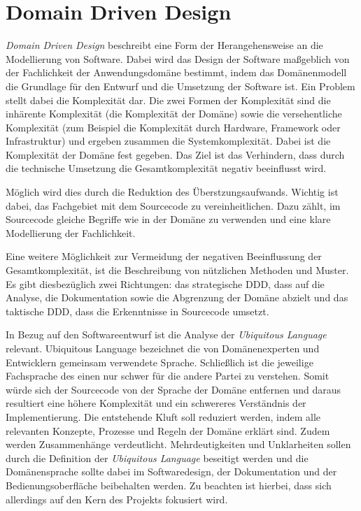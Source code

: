 \chapter{Domain Driven Design}
\textit{Domain Driven Design} beschreibt eine Form der Herangehensweise an die Modellierung von Software.
Dabei wird das Design der Software maßgeblich von der Fachlichkeit der Anwendungsdomäne bestimmt, indem das Domänenmodell die Grundlage für den Entwurf und die Umsetzung der Software ist.
Ein Problem stellt dabei die Komplexität dar.
Die zwei Formen der Komplexität sind die inhärente Komplexität (die Komplexität der Domäne) sowie die versehentliche Komplexität (zum Beispiel die Komplexität durch Hardware, Framework oder Infrastruktur) und ergeben zusammen die Systemkomplexität.
Dabei ist die Komplexität der Domäne fest gegeben.
Das Ziel ist das Verhindern, dass durch die technische Umsetzung die Gesamtkomplexität negativ beeinflusst wird.

Möglich wird dies durch die Reduktion des Überstzungsaufwands.
Wichtig ist dabei, das Fachgebiet mit dem Sourcecode zu vereinheitlichen.
Dazu zählt, im Sourcecode gleiche Begriffe wie in der Domäne zu verwenden und eine klare Modellierung der Fachlichkeit.

Eine weitere Möglichkeit zur Vermeidung der negativen Beeinflussung der Gesamtkomplexität, ist die Beschreibung von nützlichen Methoden und Muster.
Es gibt diesbezüglich zwei Richtungen: das strategische \ac{DDD}, dass auf die Analyse, die Dokumentation sowie die Abgrenzung der Domäne abzielt und das taktische \ac{DDD}, dass die Erkenntnisse in Sourcecode umsetzt.

In Bezug auf den Softwareentwurf ist die Analyse der \textit{Ubiquitous Language} relevant.
Ubiquitous Language bezeichnet die von Domänenexperten und Entwicklern gemeinsam verwendete Sprache.
Schließlich ist die jeweilige Fachsprache des einen nur schwer für die andere Partei zu verstehen.
Somit würde sich der Sourcecode von der Sprache der Domäne entfernen und daraus resultiert eine höhere Komplexität und ein schwereres Verständnis der Implementierung.
Die entstehende Kluft soll reduziert werden, indem alle relevanten Konzepte, Prozesse und Regeln der Domäne erklärt sind.
Zudem werden Zusammenhänge verdeutlicht.
Mehrdeutigkeiten und Unklarheiten sollen durch die Definition der \textit{Ubiquitous Language} beseitigt werden und die Domänensprache sollte dabei im Softwaredesign, der Dokumentation und der Bedienungsoberfläche beibehalten werden.
Zu beachten ist hierbei, dass sich allerdings auf den Kern des Projekts fokusiert wird.

